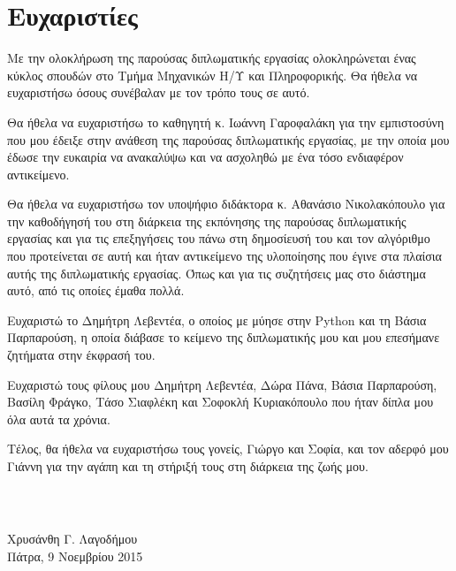 \chapter*{Ευχαριστίες}

Με την ολοκλήρωση της παρούσας διπλωματικής εργασίας ολοκληρώνεται ένας κύκλος σπουδών στο Τμήμα Μηχανικών Η/Υ και Πληροφορικής. Θα ήθελα να ευχαριστήσω όσους συνέβαλαν με τον τρόπο τους σε αυτό.\par
Θα ήθελα να ευχαριστήσω το καθηγητή κ. Ιωάννη Γαροφαλάκη για την εμπιστοσύνη που μου έδειξε στην ανάθεση της παρούσας διπλωματικής εργασίας, με την οποία μου έδωσε την ευκαιρία να ανακαλύψω και να ασχοληθώ με ένα τόσο ενδιαφέρον αντικείμενο. \par
Θα ήθελα να ευχαριστήσω τον υποψήφιο διδάκτορα κ. Αθανάσιο Νικολακόπουλο για την καθοδήγησή του στη διάρκεια της εκπόνησης της παρούσας διπλωματικής εργασίας και για τις επεξηγήσεις του πάνω στη δημοσίευσή του και τον αλγόριθμο που προτείνεται σε αυτή και ήταν αντικείμενο της υλοποίησης που έγινε στα πλαίσια αυτής της διπλωματικής εργασίας. Όπως και για τις συζητήσεις μας στο διάστημα αυτό, από τις οποίες έμαθα πολλά. \par
Ευχαριστώ το Δημήτρη Λεβεντέα, ο οποίος με μύησε στην {\en Python} και τη Βάσια Παρπαρούση, η οποία διάβασε το κείμενο της διπλωματικής μου και μου επεσήμανε ζητήματα στην έκφρασή του. \par
Ευχαριστώ τους φίλους μου Δημήτρη Λεβεντέα, Δώρα Πάνα, Βάσια Παρπαρούση, Βασίλη Φράγκο, Τάσο Σιαφλέκη και Σοφοκλή Κυριακόπουλο που ήταν δίπλα μου όλα αυτά τα χρόνια. \par
Τέλος, θα ήθελα να ευχαριστήσω τους γονείς, Γιώργο και Σοφία, και τον αδερφό μου Γιάννη για την αγάπη και τη στήριξή τους στη διάρκεια της ζωής μου. 

\paragraph{~} \hfill Χρυσάνθη Γ. Λαγοδήμου \vspace{-10pt} \\

\hfill Πάτρα, 9 Νοεμβρίου 2015